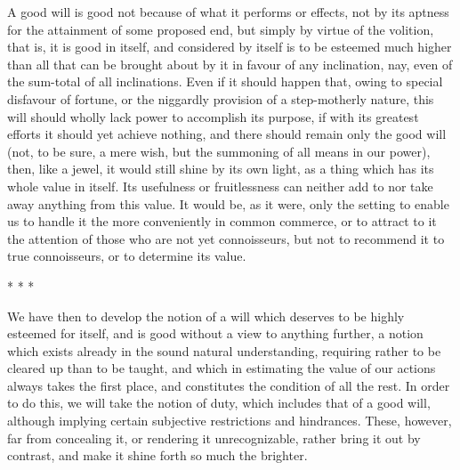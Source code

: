 A good will is good not because of what it performs or effects, not by
its aptness for the attainment of some proposed end, but simply by
virtue of the volition, that is, it is good in itself, and considered
by itself is to be esteemed much higher than all that can be brought
about by it in favour of any inclination, nay, even of the sum-total
of all inclinations. Even if it should happen that, owing to special
disfavour of fortune, or the niggardly provision of a step-motherly
nature, this will should wholly lack power to accomplish its purpose,
if with its greatest efforts it should yet achieve nothing, and there
should remain only the good will (not, to be sure, a mere wish, but
the summoning of all means in our power), then, like a jewel, it would
still shine by its own light, as a thing which has its whole value in
itself. Its usefulness or fruitlessness can neither add to nor take
away anything from this value. It would be, as it were, only the
setting to enable us to handle it the more conveniently in common
commerce, or to attract to it the attention of those who are not yet
connoisseurs, but not to recommend it to true connoisseurs, or to
determine its value.

\begin{center}* * *\end{center}

We have then to develop the notion of a will which deserves
to be highly esteemed for itself, and is good without a view to
 anything further, a notion which exists already in the sound
natural understanding, requiring rather to be cleared up than to be
taught, and which in estimating the value of our actions always takes
the first place, and constitutes the condition of all the rest. In
order to do this, we will take the notion of duty, which includes that
of a good will, although implying certain subjective restrictions and
hindrances. These, however, far from concealing it, or rendering it
unrecognizable, rather bring it out by contrast, and make it shine
forth so much the brighter.


